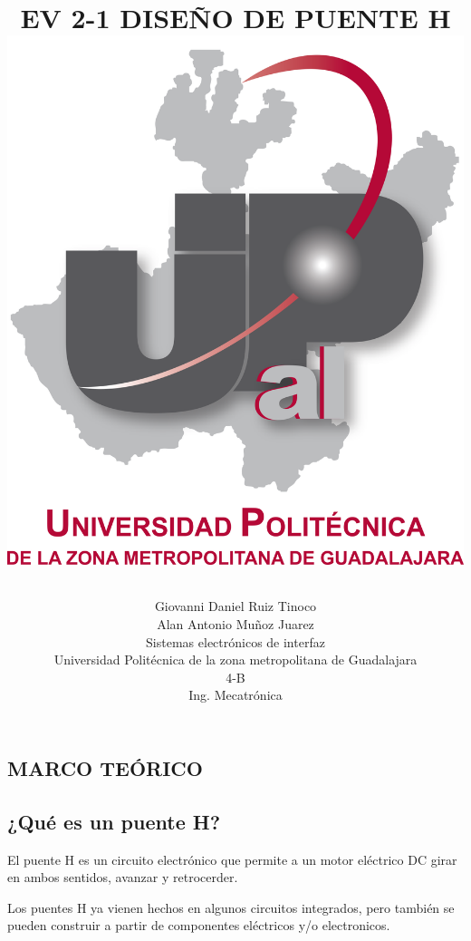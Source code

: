 \documentclass[12pt,a4paper]{article}
\title{EV 2-1 DISEÑO DE PUENTE H
\includegraphics [scale=1]{imagenes/UPZMG.png} 
\author{Giovanni Daniel Ruiz Tinoco\\
Alan Antonio Muñoz Juarez\\
\small Sistemas electrónicos de interfaz\\
  \small Universidad Politécnica de la zona metropolitana de Guadalajara\\
  \small 4-B \\
  \small Ing. Mecatrónica\\
\centering
}
}
\begin{document}
\maketitle
\newpage
\begin{center}
\section {MARCO TEÓRICO}
\end{center}
\subsection{¿Qué es un puente H?}
El puente H  es un circuito electrónico que permite a un motor eléctrico DC girar en ambos sentidos, avanzar y retrocerder.

Los puentes H ya vienen hechos en algunos circuitos integrados, pero también se pueden construir a partir de componentes eléctricos y/o electronicos.
\end{document}
